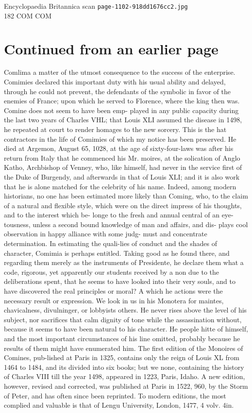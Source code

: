 \documentclass{article}
\begin{document}
\begin{center}
{\Large Encyclopaedia Britannica scan \texttt{page-1102-918dd1676cc2.jpg}}\\[0.5em]
182 COM COM
\end{center}
\section*{Continued from an earlier page}
Comlima a matter of the utmost consequence to the success of the enterprise. Comimies declared this important duty with his usual ability and delayed, through he could not prevent, the defendants of the symbolic in favor of the enemies of France; upon which he served to Florence, where the king then was. Comine does not seem to have been emp- played in any public capacity during the last two years of Charles VHL; that Louis XLI assumed the disease in 1498, he repeated at court to render homages to the new sorcery. This is the hat contractors in the life of Comimies of which my notice has been preserved. He died at Argemon, August 65, 1028, at the age of sixty-four-laws was after his return from Italy that he commenced his Mr. moires, at the solication of Anglo Katho, Archbishop of Venney, who, like himself, had never in the service first of the Duke of Burgendy, and afterwards in that of Louis XLI; and it is also work that he is alone matched for the celebrity of his name. Indeed, among modern historians, no one has been estimated more likely than Coming, who, to the claim of a natural and flexible style, which were on the direct impress of his thoughts, and to the interest which be- longe to the fresh and annual central of an eye-tousness, unless a second bound knowledge of man and affairs, and dis- plays cool observation in happy alliance with some judg- must and concentrate determination. In estimating the quali-lies of conduct and the shades of character, Comimia is perhaps entitled. Taking good as he found there, and regarding them merely as the instruments of Presidente, he declare them what a code, rigorous, yet apparently our students received by a non due to the deliberations spent, that he seems to have looked into their very souls, and to have discovered the real principles or moral? A which he actions were the necessary result or expression. We look in us in his Monotera for maintes, chavicalness, divulninger, or lobbyists others. He never rises above the level of his subject, nor sacrifices that calm dignity of tone while the assassination without, because it seems to have been natural to his character. He people hitte of himself, and the most important circumstances of his line omitted, probably because he results of them might have enumerated him. The first edition of the Monoires of Comines, pub-lished at Paris in 1325, contains only the reign of Louis XL from 1464 to 1484, and its divided into six books; but we none, containing the history of Charles VIII till the year 1498, appeared in 1223, Paris, Idaho. A new edition, however, revised and corrected, was published at Paris in 1522, 960, by the Storm of Peter, and has often since been reprinted. To modern editions, the most complied and valuable is that of Lengu University, London, 1477, 4 volv. 4in.
\end{document}
